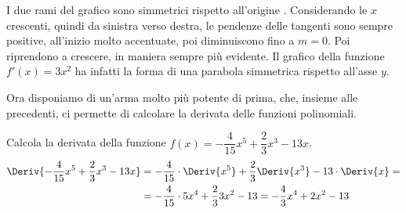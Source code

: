 
I due rami del grafico sono simmetrici rispetto all'origine
. 
Considerando le \(x\) crescenti, quindi da sinistra verso destra, le 
pendenze delle tangenti sono sempre positive, all'inizio molto 
accentuate, poi diminuiscono fino a \(m=0\). Poi riprendono a crescere, 
in maniera sempre più evidente. Il grafico della funzione \(f'(x)=3 x^2\) 
ha infatti la forma di una parabola simmetrica rispetto all'asse \(y\).

Ora disponiamo di un'arma molto più potente di prima, che, insieme alle 
precedenti, ci permette di calcolare la derivata delle funzioni 
polinomiali. 

\begin{esempio}
\label{esem:diff_prodottocostante}
Calcola la derivata della funzione 
\(f(x)=-\dfrac{4}{15}x^5 +\dfrac{2}{3}x^3-13x\).
\begin{align*}
\Deriv{-\dfrac{4}{15}x^5+ \dfrac{2}{3}x^3-13x} &= 
-\dfrac{4}{15} \cdot \Deriv{x^5} + 
 \dfrac{2}{3} \Deriv{x^3} -13 \cdot \Deriv{x}=\\
&=-\dfrac{4}{15} \cdot 5x^4 + \dfrac{2}{3} 3x^2 -13 =
-\dfrac{4}{3} x^4 + 2x^2 -13
\end{align*}
\end{esempio}


